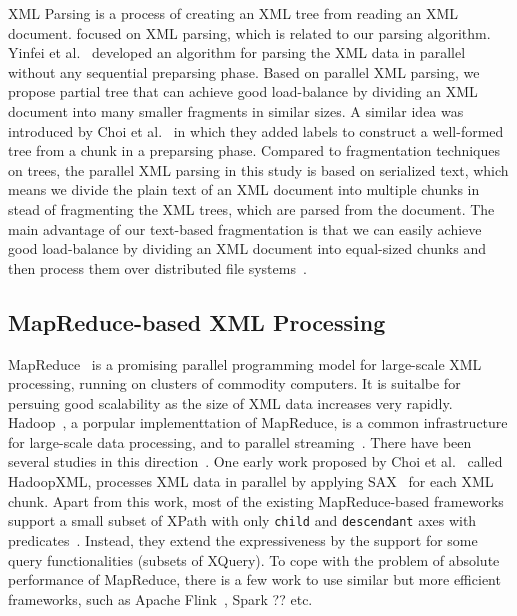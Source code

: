XML Parsing is a process of creating an XML tree from reading an XML document.
\cite{PLZC07,WZYu08} focused on XML parsing, which is related to our parsing
algorithm. Yinfei et al.~\cite{PaZC08} developed an algorithm for parsing the
XML data in parallel without any sequential preparsing phase.  Based on parallel
XML parsing, we propose partial tree that can achieve good load-balance by
dividing an XML document into many smaller fragments in similar sizes. A similar
idea was introduced by Choi et al.~\cite{ChLL14} in which they added labels to
construct a well-formed tree from a chunk in a preparsing phase. Compared to
fragmentation techniques on trees, the parallel XML parsing in this study is
based on serialized text, which means we divide the plain text of an XML
document into multiple chunks in stead of fragmenting the XML trees, which are
parsed from the document.  The main advantage of our text-based fragmentation is
that we can easily achieve good load-balance by dividing an XML document into
equal-sized chunks and then process them over distributed file
systems~\cite{dfs}. 

\subsection{MapReduce-based XML Processing} 
\label{sec:mapreduce}

MapReduce~\cite{DeGh04} is a promising parallel programming model for
large-scale XML processing, running on clusters of commodity computers. It is
suitalbe for persuing good scalability as the size of XML data increases very
rapidly. Hadoop~\cite{HadoopWhit12}, a porpular implementtation of MapReduce, is
a common infrastructure for large-scale data processing, and to parallel
streaming~\cite{OgTP13,LiZZ17}. There have been several studies in this
direction~\cite{BCMU13,CFKL12,DaGP14,EmIm12,DaGP14,MaMi16}. One early work
proposed by Choi et al.~\cite{CLKL12} called HadoopXML, processes XML data in
parallel by applying SAX~\cite{sax} for each XML chunk. Apart from this work,
most of the existing MapReduce-based frameworks support a small subset of XPath
with only \texttt{child} and \texttt{descendant} axes with
predicates~\cite{CCMN15,AfDG15,DaGP14,DaGK14}. Instead, they extend the
expressiveness by the support for some query functionalities (subsets of
XQuery). To cope with the problem of absolute performance of MapReduce, there is
a few work to use similar but more efficient frameworks, such as Apache
Flink~\cite{CCMN15}, Spark {??} etc.

